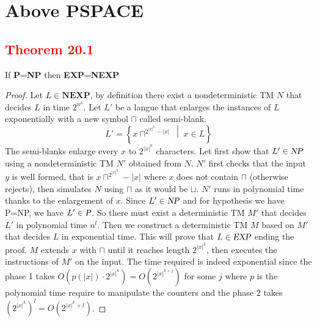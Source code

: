 \section{Above PSPACE}
\subsection{\textcolor{red}{Theorem 20.1}}
\begin{defbox}[\textcolor{red}{Theorem 20.1}]
If \textbf{P}=\textbf{NP} then \textbf{EXP}=\textbf{NEXP}    
\end{defbox}
\begin{proof}
    Let $L\in\textbf{NEXP}$, by definition there exist a nondeterministic TM $N$ that decides $L$ in time $2^{n^k}$.
    Let $L'$ be a langue that enlarges the instances of $L$ exponentially with a new symbol $\sqcap$ called semi-blank.
    $$L' = \left\{ x \sqcap^{2^{|x|^k} - |x|} \;\middle|\; x \in L \right\}$$   
    The semi-blanks enlarge every $x$ to $2^{|x|^k}$ characters. Let first show that $L'\in \textsl{NP}$ using a nondeterministic TM $N'$ obtained from $N$. $N'$ first checks that the input $y$ is well formed, that is $x\sqcap^{2^{|x|^k}}-|x|$ where $x$ does not contain $\sqcap$ (otherwise rejects), then simulates $N$ using $\sqcap$ as it would be $\sqcup$. $N'$ runs in polynomial time thanks to the enlargement of $x$. Since $L'\in \textsl{NP}$ and for hypothesis we have P=NP, we have $L'\in\textsl{P}$. So there must exist a deterministic TM $M'$ that decides $L'$ in polynomial time $n^l$. Then we construct a deterministic TM $M$ based on $M'$ that decides $L$ in exponential time. This will prove that $L\in\textsl{EXP}$ ending the proof. $M$ extends $x$ with $\sqcap$ until it reaches length $2^{|x|^k}$, then executes the instructions of $M'$ on the input. The time required is indeed exponential since the phase 1 takes $O(p(|x|)\cdot2^{|x|^k})=O(2^{|x|^{k+j}})$ for some $j$ where $p$ is the polynomial time require to manipulate the counters and the phase 2 takes $(2^{|x|^k})^l = O(2^{|x|^k+l})$. 
\end{proof}